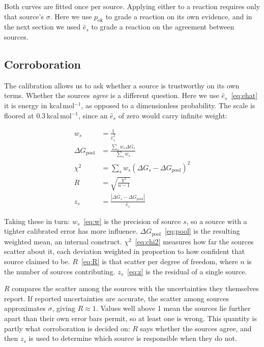 \documentclass[11pt]{article}
\begin{document}
Both curves are fitted once per source. Applying either to a reaction requires only that source's $\sigma$. Here we use $p_{\text{ok}}$ to grade a reaction on its own evidence, and in the next section we used $\hat{e}_s$ to grade a reaction on the agreement between sources.

\subsection{Corroboration} The calibration allows us to ask whether a source is trustworthy on its own terms. Whether the sources \emph{agree} is a different question. Here we use $\hat{e}_s$~\eqref{eq:ehat} it is energy in kcal\,mol$^{-1}$, as opposed to a dimensionless probability. The scale is floored at 0.3\,kcal\,mol$^{-1}$, since an $\hat{e}_s$ of zero would carry infinite weight:

\begin{align}
  w_s &= \frac{1}{\hat{e}_s^{2}} \label{eq:w} \\[2pt]
  \Delta G_{\text{pool}} &= \frac{\sum_s w_s \Delta G_s}{\sum_s w_s} \label{eq:pool} \\[2pt]
  \chi^{2} &= \sum_s w_s \left(\Delta G_s - \Delta G_{\text{pool}}\right)^{2} \label{eq:chi2} \\[2pt]
  R &= \sqrt{\frac{\chi^{2}}{n-1}} \label{eq:R} \\[2pt]
  z_s &= \frac{\left|\Delta G_s - \Delta G_{\text{pool}}\right|}{\hat{e}_s} \label{eq:z}
\end{align}

Taking these in turn: $w_s$~\eqref{eq:w} is the precision of source $s$, so a source with a tighter calibrated error has more influence. $\Delta G_{\text{pool}}$~\eqref{eq:pool} is the resulting weighted mean, an internal construct. $\chi^{2}$~\eqref{eq:chi2} measures how far the sources scatter about it, each deviation weighted in proportion to how confident that source claimed to be. $R$~\eqref{eq:R} is that scatter per degree of freedom, where $n$ is the number of sources contributing. $z_s$~\eqref{eq:z} is the residual of a single source.

$R$ compares the scatter among the sources with the uncertainties they themselves report. If reported uncertainties are accurate, the scatter among sources approximates $\sigma$, giving $R \approx 1$. Values well above 1 mean the sources lie further apart than their own error bars permit, so at least one is wrong. This quantity is partly what corroboration is decided on: $R$ says whether the sources agree, and then $z_s$ is used to determine which source is responsible when they do not.
\end{document}
